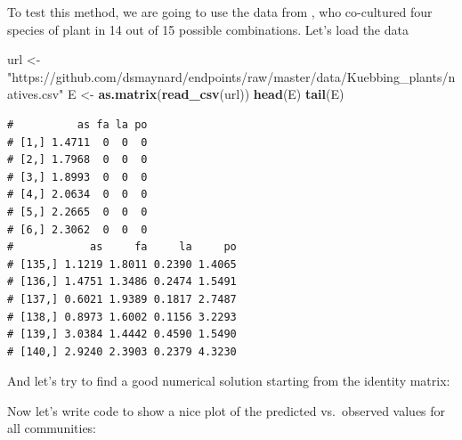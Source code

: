 \documentclass[]{book}
\newenvironment{Shaded}{\begin{snugshade}}{\end{snugshade}}
\newcommand{\DataTypeTok}[1]{\textcolor[rgb]{0.13,0.29,0.53}{#1}}
\newcommand{\DecValTok}[1]{\textcolor[rgb]{0.00,0.00,0.81}{#1}}
\newcommand{\KeywordTok}[1]{\textcolor[rgb]{0.13,0.29,0.53}{\textbf{#1}}}
\newcommand{\NormalTok}[1]{#1}
\newcommand{\OperatorTok}[1]{\textcolor[rgb]{0.81,0.36,0.00}{\textbf{#1}}}
\newcommand{\StringTok}[1]{\textcolor[rgb]{0.31,0.60,0.02}{#1}}
\begin{document}
To test this method, we are going to use the data from \citet{kuebbing2015above}, who co-cultured four species of plant in 14 out of 15 possible combinations. Let's load the data

\begin{Shaded}
\begin{Highlighting}[]
\NormalTok{url <-}\StringTok{ "https://github.com/dsmaynard/endpoints/raw/master/data/Kuebbing_plants/natives.csv"}
\NormalTok{E <-}\StringTok{ }\KeywordTok{as.matrix}\NormalTok{(}\KeywordTok{read_csv}\NormalTok{(url))}
\KeywordTok{head}\NormalTok{(E)}
\KeywordTok{tail}\NormalTok{(E)}
\end{Highlighting}
\end{Shaded}

\begin{verbatim}
#          as fa la po
# [1,] 1.4711  0  0  0
# [2,] 1.7968  0  0  0
# [3,] 1.8993  0  0  0
# [4,] 2.0634  0  0  0
# [5,] 2.2665  0  0  0
# [6,] 2.3062  0  0  0
#            as     fa     la     po
# [135,] 1.1219 1.8011 0.2390 1.4065
# [136,] 1.4751 1.3486 0.2474 1.5491
# [137,] 0.6021 1.9389 0.1817 2.7487
# [138,] 0.8973 1.6002 0.1156 3.2293
# [139,] 3.0384 1.4442 0.4590 1.5490
# [140,] 2.9240 2.3903 0.2379 4.3230
\end{verbatim}

And let's try to find a good numerical solution starting from the identity matrix:

\begin{Shaded}
\end{Shaded}

Now let's write code to show a nice plot of the predicted vs.~observed values for all communities:
\end{document}
